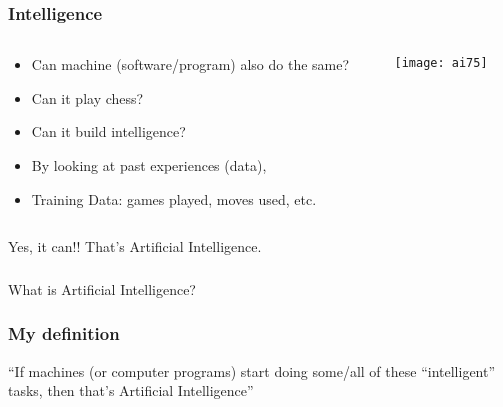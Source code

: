 \begin{frame}[fragile]\frametitle{Intelligence}

\begin{columns}
    \begin{column}[T]{0.6\linewidth}

\begin{itemize}
\item Can machine (software/program) also do the same?
\item Can it play chess?
\item Can it build intelligence?
\item By looking at past experiences (data), 
\item Training Data: games played, moves used, etc.
\end{itemize}

    \end{column}
    \begin{column}[T]{0.4\linewidth}

			\begin{center}
			\texttt{[image: ai75]}
			\end{center}
			
    \end{column}
  \end{columns}
  
  

Yes, it can!! That's Artificial Intelligence.
\end{frame}

\begin{frame}[fragile]\frametitle{}
\begin{center}
{\Large What is Artificial Intelligence?}
\end{center}
\end{frame}



\begin{frame}[fragile]\frametitle{ My definition}
``If machines (or computer programs) start doing some/all of these ``intelligent'' tasks, then that's Artificial Intelligence''

\end{frame}

